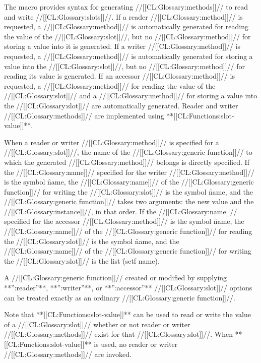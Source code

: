 The macro  provides syntax for generating //[[CL:Glossary:methods]]// to
read and write //[[CL:Glossary:slots]]//.  If a reader //[[CL:Glossary:method]]// is requested, 
a //[[CL:Glossary:method]]// is automatically generated for reading the value of the
//[[CL:Glossary:slot]]//, but no //[[CL:Glossary:method]]// for storing a value into it is generated.
If a writer //[[CL:Glossary:method]]// is requested, a //[[CL:Glossary:method]]// is automatically 
generated for storing a value into the //[[CL:Glossary:slot]]//, but no //[[CL:Glossary:method]]// 
for reading its value is generated.  If an accessor //[[CL:Glossary:method]]// is 
requested, a //[[CL:Glossary:method]]// for reading the value of the //[[CL:Glossary:slot]]// and a
//[[CL:Glossary:method]]// for storing a value into the //[[CL:Glossary:slot]]// are automatically
generated.  Reader and writer //[[CL:Glossary:methods]]// are implemented using
**[[CL:Functions:slot-value]]**.

When a reader or writer //[[CL:Glossary:method]]// is specified for a //[[CL:Glossary:slot]]//, the
name of the //[[CL:Glossary:generic function]]// to which the generated //[[CL:Glossary:method]]//
belongs is directly specified.  If the //[[CL:Glossary:name]]// specified for the writer
//[[CL:Glossary:method]]// is the symbol \f{name}, the //[[CL:Glossary:name]]// of the
//[[CL:Glossary:generic function]]// for writing the //[[CL:Glossary:slot]]// is the symbol
\f{name}, and the //[[CL:Glossary:generic function]]// takes two arguments: the new
value and the //[[CL:Glossary:instance]]//, in that order.  If the //[[CL:Glossary:name]]// specified
for the accessor //[[CL:Glossary:method]]// is the symbol \f{name}, the //[[CL:Glossary:name]]// of
the //[[CL:Glossary:generic function]]// for reading the //[[CL:Glossary:slot]]// is the symbol 
\f{name}, and the //[[CL:Glossary:name]]// of the //[[CL:Glossary:generic function]]// for writing 
the //[[CL:Glossary:slot]]// is the list \f{(setf name)}.

A //[[CL:Glossary:generic function]]// created or modified by supplying **'':reader''**,
**'':writer''**, or **'':accessor''** //[[CL:Glossary:slot]]// options can be treated exactly
as an ordinary //[[CL:Glossary:generic function]]//.
           
Note that **[[CL:Functions:slot-value]]** can be used to read or write the value of a
//[[CL:Glossary:slot]]// whether or not reader or writer //[[CL:Glossary:methods]]// exist for that
//[[CL:Glossary:slot]]//.  When **[[CL:Functions:slot-value]]** is used, no reader or writer
//[[CL:Glossary:methods]]// are invoked.

